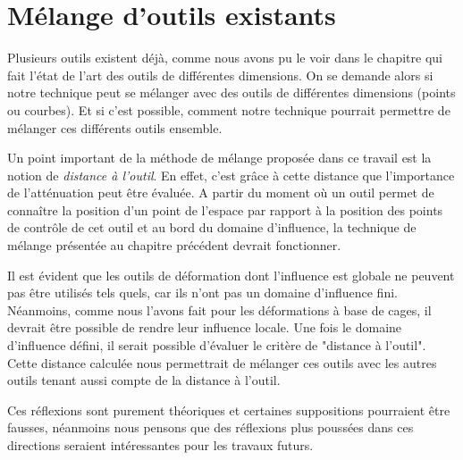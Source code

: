 \section{Mélange d'outils existants}

Plusieurs outils existent déjà, comme nous avons pu le voir dans le chapitre
qui fait l'état de l'art des outils de différentes dimensions. On se demande
alors si notre technique peut se mélanger avec des outils de différentes
dimensions (points ou courbes). Et si c'est possible, comment notre technique
pourrait permettre de mélanger ces différents outils ensemble.

Un point important de la méthode de mélange proposée dans ce travail est la
notion de \textit{distance à l'outil}. En effet, c'est grâce à cette distance
que l'importance de l'atténuation peut être évaluée. A partir du moment où un
outil permet de connaître la position d'un point de l'espace par rapport à la
position des points de contrôle de cet outil et au bord du domaine
d'influence, la technique de mélange présentée au chapitre précédent devrait
fonctionner.

Il est évident que les outils de déformation dont l'influence est globale ne
peuvent pas être utilisés tels quels, car ils n'ont pas un domaine d'influence
fini. Néanmoins, comme nous l'avons fait pour les déformations à base de
cages, il devrait être possible de rendre leur influence locale. Une fois le
domaine d'influence défini, il serait possible d'évaluer le critère de
"distance à l'outil". Cette distance calculée nous permettrait de mélanger ces
outils avec les autres outils tenant aussi compte de la distance à l'outil.

Ces réflexions sont purement théoriques et certaines suppositions pourraient
être fausses, néanmoins nous pensons que des réflexions plus poussées dans ces
directions seraient intéressantes pour les travaux futurs.
